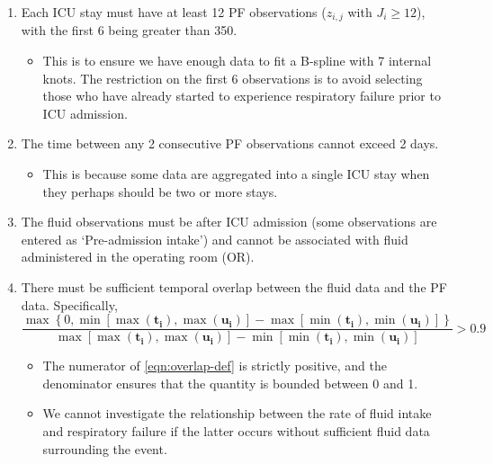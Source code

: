 \documentclass[
  10pt,
  a4paper,
]{article}
\providecommand{\tightlist}{%
  \setlength{\itemsep}{0pt}\setlength{\parskip}{0pt}}
\begin{document}
\begin{enumerate}
\def\labelenumi{\arabic{enumi}.}
\tightlist
\item
  Each ICU stay must have at least 12 PF observations (\(z_{i, j}\) with
  \(J_{i} \geq 12\)), with the first 6 being greater than 350.

  \begin{itemize}
  \tightlist
  \item
    This is to ensure we have enough data to fit a B-spline with 7
    internal knots. The restriction on the first 6 observations is to
    avoid selecting those who have already started to experience
    respiratory failure prior to ICU admission.
  \end{itemize}
\item
  The time between any 2 consecutive PF observations cannot exceed 2
  days.

  \begin{itemize}
  \tightlist
  \item
    This is because some data are aggregated into a single ICU stay when
    they perhaps should be two or more stays.
  \end{itemize}
\item
  The fluid observations must be after ICU admission (some observations
  are entered as `Pre-admission intake') and cannot be associated with
  fluid administered in the operating room (OR).
\item
  There must be sufficient temporal overlap between the fluid data and
  the PF data. Specifically, \begin{equation}
   \frac{
     \max\left\{0, \min\left[\max(\boldsymbol{t_{i}}), \max(\boldsymbol{u_{i}})\right] - \max\left[\min(\boldsymbol{t_{i}}), \min(\boldsymbol{u_{i}})\right]\right\}
   } {
     \max\left[\max(\boldsymbol{t_{i}}), \max(\boldsymbol{u_{i}})\right] - \min\left[\min(\boldsymbol{t_{i}}), \min(\boldsymbol{u_{i}})\right]
   }
   > 0.9
   \label{eqn:overlap-def}
    \end{equation}

  \begin{itemize}
  \tightlist
  \item
    The numerator of \eqref{eqn:overlap-def} is strictly positive, and
    the denominator ensures that the quantity is bounded between 0 and
    1.
  \item
    We cannot investigate the relationship between the rate of fluid
    intake and respiratory failure if the latter occurs without
    sufficient fluid data surrounding the event.
  \end{itemize}
\end{enumerate}
\end{document}
